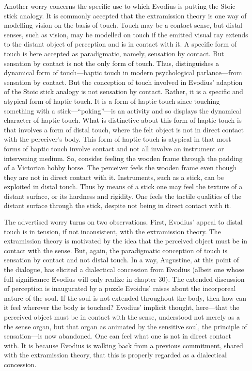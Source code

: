 \documentclass[12pt]{article}
\begin{document}
Another worry concerns the specific use to which Evodius is putting the Stoic stick analogy. It is commonly accepted that the extramission theory is one way of modelling vision on the basis of touch. Touch may be a contact sense, but distal senses, such as vision, may be modelled on touch if the emitted visual ray extends to the distant object of perception and is in contact with it. A specific form of touch is here accepted as paradigmatic, namely, sensation by contact. But sensation by contact is not the only form of touch. Thus, \citet{Broad:1952kx} distinguishes a dynamical form of touch---haptic touch in modern psychological parlance---from sensation by contact. But the conception of touch involved in Evodius' adaption of the Stoic stick analogy is not sensation by contact. Rather, it is a specific and atypical form of haptic touch. It is a form of haptic touch since touching something with a stick---``poking''---is an activity and so displays the dynamical character of haptic touch. What is distinctive about this form of haptic touch is that involves a form of distal touch, where the felt object is not in direct contact with the perceiver's body. This form of haptic touch is atypical in that most forms of haptic touch involve contact and not all involve an instrument or intervening medium. So, consider feeling the wooden frame through the padding of a Victorian hobby horse. The perceiver feels the wooden frame even though they are not in direct contact with it. Instruments, such as a stick, can be exploited in distal touch. Thus by means of a stick one may feel the texture of a distant surface, or its hardness and rigidity. One feels the tactile qualities of the distant surface through the stick, despite not being in direct contact with it. 

The advertised worry turns on two observations. First, Evodius' appeal to distal touch is in tension, if not inconsistent, with the extramission theory. The extramission theory is motivated by the idea that the perceived object must be in contact with the sense. But, again, the paradigmatic conception of touch is sensation by contact and not distal touch. In a way, Augustine, at this point of the dialogue, has elicited a dialectical concession from Evodius (albeit one whose full significance Evodius will only realize in chapter 30). The extended discussion of perception is inaugurated by a puzzle Evoidus' raises about the incorporeal nature of the soul. If the soul is not extended throughout the body, then how can it feel wherever the body is touched? Evodius' implicit thought, here---that the perceived object must be in contact with the sense, understood not merely as a the sense organ, but that organ as animated by the sensitive soul, the principle of sensation---is now abandoned. One can feel what one is not in direct contact with. It is because Evodius is walking back from a previous commitment, shared with the extramission theory, that this is properly regarded as a dialectical concession.
\end{document}
